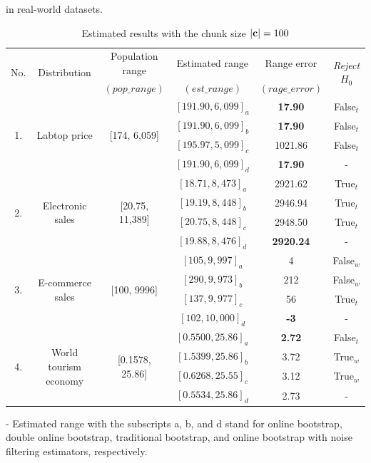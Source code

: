 \documentclass[a4paper,fleqn]{cas-dc}
\begin{document}
\begin{table}[h!]
\centering
\caption{Estimated results with the chunk size $|{\bf c}|=100$} in real-world datasets.\label{tab:res_realworld2_100}
\begin{threeparttable}
\begin{tabular}{|c|c|c|c|c|c|}
\hline
\multirow{2}{*}{No.} & \multirow{2}{*}{Distribution} & Population range & 
Estimated range&Range error& \multirow{2}{*}{\it{Reject} $H_0$} \\
&&$(pop\_range)$&$(est\_range)$&$(rage\_error)$& \\
\hline
\multirow{4}{*}{1.} & \multirow{4}{*}{Labtop price}&\multirow{4}{*}{[174, 6,059]} & $[191.90, 6,099]_a$& 
    \bf{17.90} & False$_t$\\
    &&&$[191.90, 6,099]_b$ & \bf{17.90} & False$_t$\\
    &&&$[195.97, 5,099]_c$ & 1021.86      & False$_t$\\
    &&&$[191.90, 6,099]_d$ & \bf{17.90} & - \\
\hline
    \multirow{4}{*}{2.} & \multirow{4}{*}{Electronic sales}&\multirow{4}{*}{[20.75, 11,389]} & 
    $[18.71, 8,473]_a$& 
    2921.62 & True$_t$\\
    &&&$[19.19, 8,448]_b$ & 2946.94 & True$_t$\\
    &&&$[20.75, 8,448]_c$ & 2948.50     & True$_t$\\
    &&&$[19.88, 8,476]_d$ & \bf{2920.24} & - \\
\hline
\multirow{4}{*}{3.} & \multirow{4}{*}{E-commerce sales}&\multirow{4}{*}{[100, 9996]} & $[105, 9,997]_a$& 
    4 & False$_w$\\
    &&&$[290, 9,973]_b$ & 212 & False$_w$\\
    &&&$[137, 9,977]_c$ & 56     & True$_t$\\
    &&&$[102, 10,000]_d$ & \bf{-3} & - \\
\hline
\multirow{4}{*}{4.} & \multirow{4}{*}{World tourism economy}&\multirow{4}{*}{[0.1578, 25.86]} & 
$[0.5500, 25.86]_a$& 
    \bf{2.72} & False$_t$\\
    &&&$[1.5399, 25.86]_b$ & 3.72 & True$_w$\\
    &&&$[0.6268, 25.55]_c$ & 3.12     &  True$_w$\\
    &&&$[0.5534, 25.86]_d$ & 2.73 & - \\        
\bottomrule
\end{tabular}
\begin{tablenotes}
          \scriptsize
          \item - Estimated range with the subscripts a, b, and d stand for online bootstrap, double online bootstrap, traditional bootstrap, and online bootstrap with noise filtering estimators, respectively.

\end{tablenotes}
\end{threeparttable}
\end{table}
\end{document}
